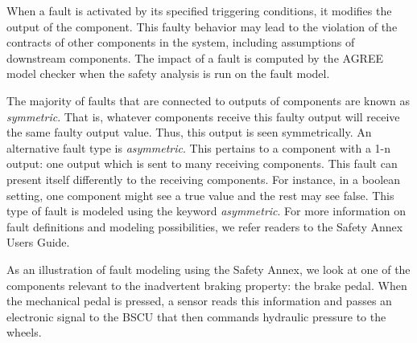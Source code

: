 When a fault is activated by its specified triggering conditions, it modifies the output of the component. This faulty behavior may lead to the violation of the contracts of other components in the system, including assumptions of downstream components. The impact of a fault is computed by the AGREE model checker when the safety analysis is run on the fault model. 

The majority of faults that are connected to outputs of components are known as \textit{symmetric}. That is, whatever components receive this faulty output will receive the same faulty output value. Thus, this output is seen symmetrically. An alternative fault type is \textit{asymmetric}. This pertains to a component with a 1-n output: one output which is sent to many receiving components. This fault can present itself differently to the receiving components. For instance, in a boolean setting, one component might see a true value and the rest may see false. This type of fault is modeled using the keyword \textit{asymmetric}. For more information on fault definitions and modeling possibilities, we refer readers to the Safety Annex Users Guide\cite{SAGithub}. %

As an illustration of fault modeling using the Safety Annex, we look at one of the components relevant to the inadvertent braking property: the brake pedal. When the mechanical pedal is pressed, a sensor reads this information and passes an electronic signal to the BSCU that then commands hydraulic pressure to the wheels. 

